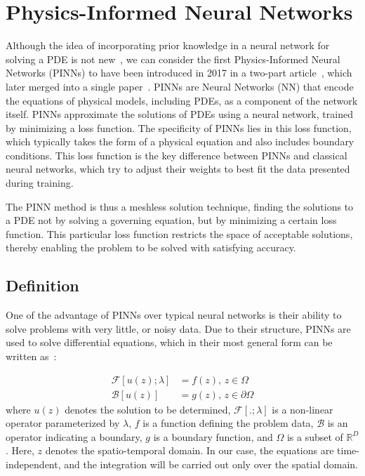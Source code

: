 \chapter{Physics-Informed Neural Networks}\label{ch:pinns}

Although the idea of incorporating prior knowledge in a neural network for solving a PDE is not new~\cite{dissanayake1994}, we can consider the first Physics-Informed Neural Networks (PINNs) to have been introduced in 2017 in a two-part article~\cite{raissi_physics_2017,raissi_physics_2017-1}, which later merged into a single paper~\cite{raissi_physics-informed_2019}. PINNs are Neural Networks (NN) that encode the equations of physical models, including PDEs, as a component of the network itself. PINNs approximate the solutions of PDEs using a neural network, trained by minimizing a loss function. The specificity of PINNs lies in this loss function, which typically takes the form of a physical equation and also includes boundary conditions. This loss function is the key difference between PINNs and classical neural networks, which try to adjust their weights to best fit the data presented during training.
\par The PINN method is thus a meshless solution technique, finding the solutions to a PDE not by solving a governing equation, but by minimizing a certain loss function. This particular loss function restricts the space of acceptable solutions, thereby enabling the problem to be solved with satisfying accuracy.

\section{Definition}

One of the advantage of PINNs over typical neural networks is their ability to solve problems with very little, or noisy data. Due to their structure, PINNs are used to solve differential equations, which in their most general form can be written as~\cite{cuomo_scientific_2022}:

\begin{equation}
    \label{eq:pde-general}
    \begin{split}
        \mathcal{F}\left[ u(z); \lambda \right] &= f(z) \text{, } z \in \Omega\\
        \mathcal{B}\left[ u(z) \right] &= g(z) \text{, } z \in \partial\Omega
    \end{split}
\end{equation} where $u(z)$ denotes the solution to be determined, $\mathcal{F}[.;\lambda]$ is a non-linear operator parameterized by $\lambda$, $f$ is a function defining the problem data, $\mathcal{B}$ is an operator indicating a boundary, $g$ is a boundary function, and $\Omega$ is a subset of $\mathbb{R}^D$. Here, $z$ denotes the spatio-temporal domain. In our case, the equations are time-independent, and the integration will be carried out only over the spatial domain.

